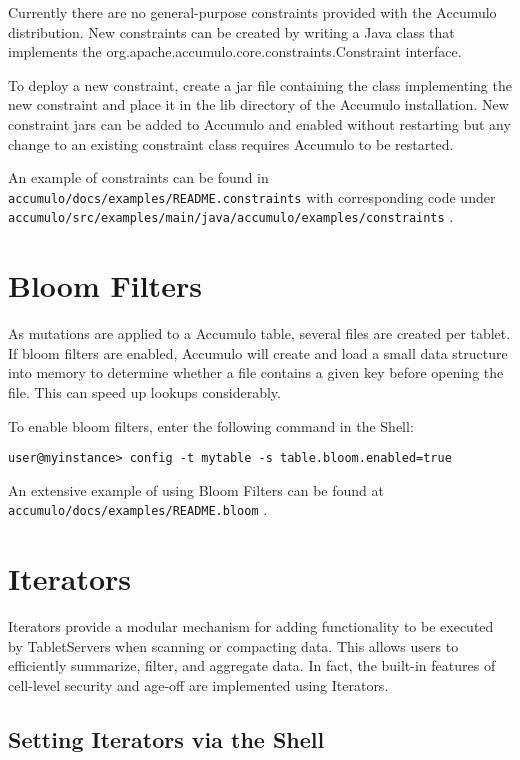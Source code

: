 Currently there are no general-purpose constraints provided with the Accumulo
distribution. New constraints can be created by writing a Java class that implements
the org.apache.accumulo.core.constraints.Constraint interface.

To deploy a new constraint, create a jar file containing the class implementing the
new constraint and place it in the lib directory of the Accumulo installation. New
constraint jars can be added to Accumulo and enabled without restarting but any
change to an existing constraint class requires Accumulo to be restarted.

An example of constraints can be found in\\
\texttt{accumulo/docs/examples/README.constraints} with corresponding code under\\
\texttt{accumulo/src/examples/main/java/accumulo/examples/constraints} .

\section{Bloom Filters}
As mutations are applied to a Accumulo table, several files are created per tablet. If
bloom filters are enabled, Accumulo will create and load a small data structure into
memory to determine whether a file contains a given key before opening the file.
This can speed up lookups considerably.

To enable bloom filters, enter the following command in the Shell:

\small
\begin{verbatim}
user@myinstance> config -t mytable -s table.bloom.enabled=true
\end{verbatim}
\normalsize

An extensive example of using Bloom Filters can be found at\\
\texttt{accumulo/docs/examples/README.bloom} .

\section{Iterators}
Iterators provide a modular mechanism for adding functionality to be executed by
TabletServers when scanning or compacting data. This allows users to efficiently
summarize, filter, and aggregate data. In fact, the built-in features of cell-level
security and age-off are implemented using Iterators.

\subsection{Setting Iterators via the Shell}

